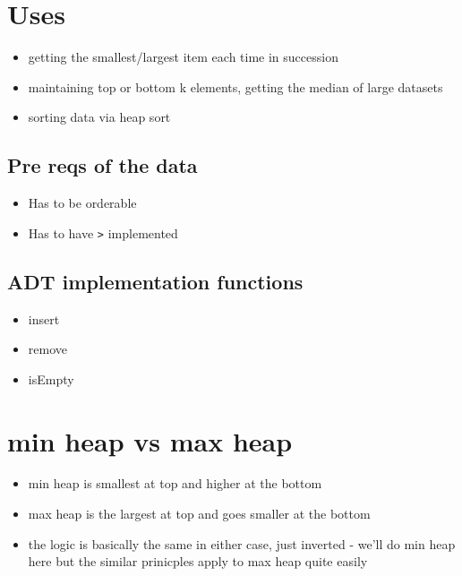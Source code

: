 \documentclass[
]{book}
\providecommand{\tightlist}{%
  \setlength{\itemsep}{0pt}\setlength{\parskip}{0pt}}
\begin{document}
\hypertarget{uses}{%
\section{Uses}\label{uses}}

\begin{itemize}
\item
  getting the smallest/largest item each time in succession
\item
  maintaining top or bottom k elements, getting the median of large datasets
\item
  sorting data via heap sort
\end{itemize}

\hypertarget{pre-reqs-of-the-data}{%
\subsection{Pre reqs of the data}\label{pre-reqs-of-the-data}}

\begin{itemize}
\item
  Has to be orderable
\item
  Has to have \texttt{\textgreater{}} implemented
\end{itemize}

\hypertarget{adt-implementation-functions}{%
\subsection{ADT implementation functions}\label{adt-implementation-functions}}

\begin{itemize}
\tightlist
\item
  insert
\item
  remove
\item
  isEmpty
\end{itemize}

\hypertarget{min-heap-vs-max-heap}{%
\section{min heap vs max heap}\label{min-heap-vs-max-heap}}

\begin{itemize}
\item
  min heap is smallest at top and higher at the bottom
\item
  max heap is the largest at top and goes smaller at the bottom
\item
  the logic is basically the same in either case, just inverted - we'll do min heap here but the similar prinicples apply to max heap quite easily
\end{itemize}
\end{document}

